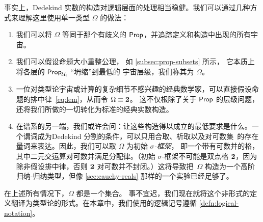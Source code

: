 事实上，Dedekind 实数的构造对逻辑层面的处理相当稳健。我们可以通过几种方式来理解这里使用单一类型 $\Omega$ 的做法：
%

\begin{enumerate}

\item 我们可以将 $\Omega$ 等同于那个有歧义的 $\mathsf{Prop}$，并追踪定义和构造中出现的所有宇宙。

\item 我们可以假设命题大小重整公理，
  如 \cref{subsec:prop-subsets} 所示，
  它本质上将各层的 $\mathsf{Prop}_{\mathcal{U}_i}$ “坍缩”到最低的
  宇宙层级，我们称其为 $\Omega$。

\item 一位对类型论宇宙或计算的复杂细节不感兴趣的经典数学家，可以直接假设命题的排中律~\eqref{eq:lem}，从而令 $\Omega \equiv \mathbf{2}$。
  这不仅根除了关于 $\mathsf{Prop}$ 的层级问题，还将我们所做的一切转化为标准的经典实数构造。

\item 在谱系的另一端，我们或许会问：让这些构造得以成立的最低要求是什么。一个谓词成为Dedekind 分割的条件，可以只用合取、析取以及对可数集~\Q 的存在量词来表达。因此，我们可以取 $\Omega$ 为初始 \emph{$\sigma$-框架}，
  即一个带有可数并的格，其中二元交运算对可数并满足分配律。（初始 $\sigma$-框架不可能是双点格 $\mathbf{2}$，因为除非假设排中律，否则 $\mathbf{2}$ 对可数并不封闭。）这将导致把~$\Omega$ 构造为一个高阶归纳-归纳类型，但像 \cref{sec:cauchy-reals} 那样的一个实验已经足够了。
\end{enumerate}

在上述所有情况下，$\Omega$ 都是一个集合。
%
事不宜迟，我们现在就将这个非形式的定义翻译为类型论的形式。在本章中，我们使用的逻辑记号遵循 \cref{defn:logical-notation}。

